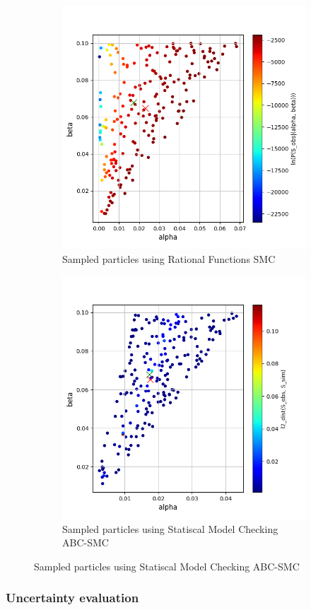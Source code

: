 \begin{figure}[!htb]
    \centering
    \begin{subfigure}{0.48\textwidth}
        \centering
        \includegraphics[width=\linewidth]{figures/sir510_rfsmc.png}
        \caption{Sampled particles using Rational Functions SMC}
    \end{subfigure}
    \hfill
    \begin{subfigure}{0.48\textwidth}
        \centering
        \includegraphics[width=\linewidth]{figures/sir510_abcsmc.png}
        \caption{Sampled particles using Statiscal Model Checking ABC-SMC}
    \end{subfigure}
\end{figure}

\subsubsection{Uncertainty evaluation}

